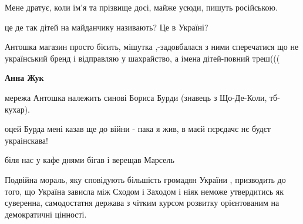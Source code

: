\begin{itemize}
\begin{itemize}
Мене дратує, коли ім'я та прізвище досі, майже усюди, пишуть російською.
\end{itemize}

 
це де так дітей на майданчику називають? Це в Україні?

 

Антошка магазин просто бісить, мішутка ,-задовбалася з ними сперечатися що не
український бренд і відправляю у шахрайство, а імена дітей-повний треш(((

\begin{itemize}
 
\textbf{Анна Жук} 

мережа Антошка належить синові Бориса Бурди (знавець з Що-Де-Коли, тб-кухар).

оцей Бурда мені казав ще до війни - пака я жив, в маєй пєрєдачє нє будєт
украінскава!

\end{itemize}

 
біля нас у кафе днями бігав і верещав Марсель


Подвійна мораль, яку сповідують більшість громадян України , призводить до
того, що Україна зависла між Сходом і Заходом і ніяк неможе утвердитись як
суверенна, самодостатня держава з чітким курсом розвитку орієнтованим на
демократичні цінності.


\end{itemize}
